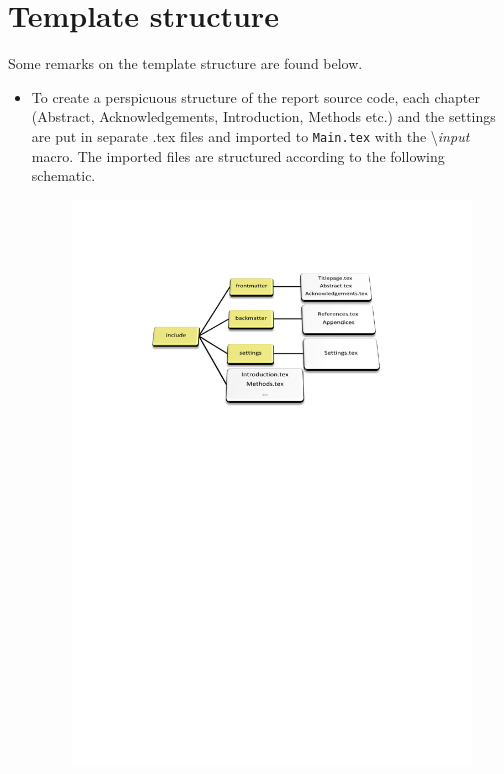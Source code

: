\documentclass[11pt,a4paper]{article}                    			%
\numberwithin{figure}{section}                         %
\numberwithin{table}{section}                         	%
\begin{document}
\newpage
\section{Template structure}
Some remarks on the template structure are found below.

\begin{itemize}
\item To create a perspicuous structure of the report source code, each chapter (Abstract, Acknowledgements, Introduction, Methods etc.) and the settings are put in separate .tex files and imported to \texttt{Main.tex} with the \textbackslash\emph{input} macro. The imported files are structured according to  the following schematic.

\begin{figure}[h!]
\centering
\includegraphics[scale=0.7, trim=3cm 18.5cm 3cm 3.5cm]{Structure.pdf}
\end{figure}


\end{itemize}
\end{document}
